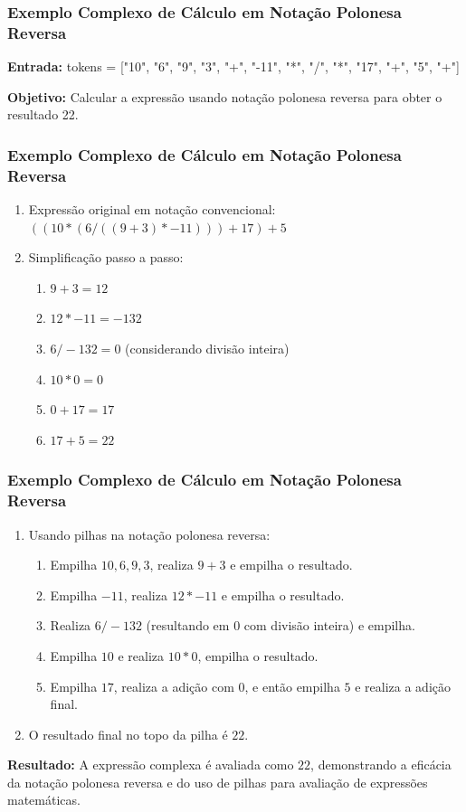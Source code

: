 \begin{frame}[fragile]
  \frametitle{Exemplo Complexo de Cálculo em Notação Polonesa Reversa}

  \textbf{Entrada:} tokens = ["10", "6", "9", "3", "+", "-11", "*", "/", "*", "17", "+", "5", "+"]

  \textbf{Objetivo:} Calcular a expressão usando notação polonesa reversa para obter o resultado 22.

  
\end{frame}

\begin{frame}[fragile]
  \frametitle{Exemplo Complexo de Cálculo em Notação Polonesa Reversa}



  \begin{enumerate}
    \item Expressão original em notação convencional: \(((10 \ast (6 / ((9 + 3) \ast -11))) + 17) + 5\)
    \item Simplificação passo a passo:
      \begin{enumerate}
        \item \(9 + 3 = 12\)
        \item \(12 \ast -11 = -132\)
        \item \(6 / -132 = 0\) (considerando divisão inteira)
        \item \(10 \ast 0 = 0\)
        \item \(0 + 17 = 17\)
        \item \(17 + 5 = 22\)
      \end{enumerate}
  \end{enumerate}

\end{frame}

\begin{frame}[fragile]
  \frametitle{Exemplo Complexo de Cálculo em Notação Polonesa Reversa}


  \begin{enumerate}
   
    \item Usando pilhas na notação polonesa reversa:
      \begin{enumerate}
        \item Empilha \(10, 6, 9, 3\), realiza \(9 + 3\) e empilha o resultado.
        \item Empilha \(-11\), realiza \(12 \ast -11\) e empilha o resultado.
        \item Realiza \(6 / -132\) (resultando em \(0\) com divisão inteira) e empilha.
        \item Empilha \(10\) e realiza \(10 \ast 0\), empilha o resultado.
        \item Empilha \(17\), realiza a adição com \(0\), e então empilha \(5\) e realiza a adição final.
      \end{enumerate}
    \item O resultado final no topo da pilha é \(22\).
  \end{enumerate}

  \textbf{Resultado:} A expressão complexa é avaliada como \(22\), demonstrando a eficácia da notação polonesa reversa e do uso de pilhas para avaliação de expressões matemáticas.
\end{frame}
